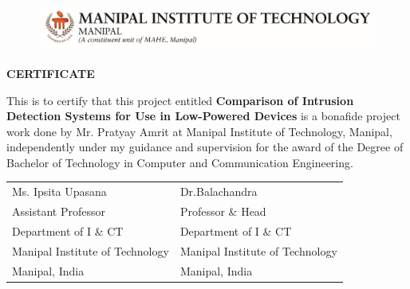 \begin{figure}[bpht!]
  \begin{center}
	\includegraphics[scale=1]{MITLogo}
	\end{center}
	\end{figure}
\begin{center}
\large{\textbf{CERTIFICATE}}\\
\end{center}


This is to certify that this project entitled \textbf{Comparison of Intrusion Detection Systems for Use in Low-Powered Devices} is a bonafide project work done by Mr. Pratyay Amrit at Manipal Institute of Technology, Manipal, independently under my guidance and supervision for the award of the Degree of
Bachelor of Technology in Computer and Communication Engineering.


\vspace{4cm}

\begin{table}[h]
	\centering
		\begin{tabular}{p{3in} p{3in}}
			Ms. Ipsita Upasana &  Dr.Balachandra  \\
			Assistant Professor & Professor \& Head \\
			  Department of I \& CT&  Department of I \& CT \\
			Manipal Institute of Technology  & Manipal Institute of Technology\\
			Manipal, India &  Manipal, India
		\end{tabular}
\end{table}
